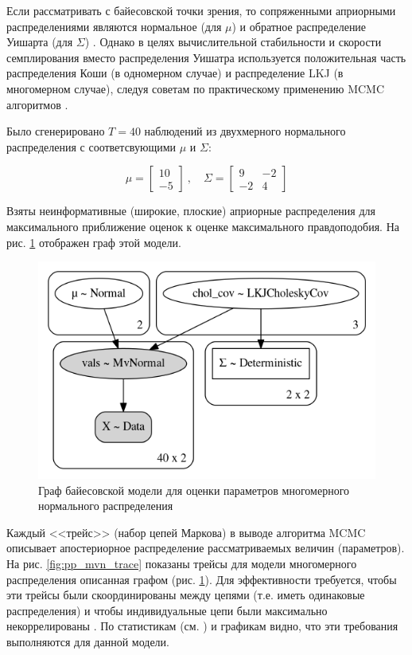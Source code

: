\documentclass[a4paper,14pt]{extreport}
\begin{document}
Если рассматривать с байесовской точки зрения, то сопряженными априорными распределениями являются нормальное (для $\mu$) и обратное распределение Уишарта (для $\Sigma$) \cite{stan_user_guide}. Однако в целях вычислительной стабильности и скорости семплирования вместо распределения Уишатра используется положительная часть распределения Коши (в одномерном случае) и распределение LKJ (в многомерном случае), следуя советам по практическому применению MCMC алгоритмов \cite{stan_user_guide}.

Было сгенерировано $T=40$ наблюдений из двухмерного нормального распределения с соответсвующими $\mu$ и $\Sigma$:

\begin{equation}
	\mu = 
	\begin{bmatrix}
		10 \\
		-5
	\end{bmatrix}
	\	, \quad
	\Sigma = 
	\begin{bmatrix} 
		9  & -2 \\
		-2 & 4 
	\end{bmatrix}
\end{equation}

Взяты неинформативные (широкие, плоские) априорные распределения для максимального приближение оценок к оценке максимального правдоподобия. На рис. \ref{fig:pp_mvn_graph} отображен граф этой модели.

\begin{figure}[H]
	\includegraphics[width=\linewidth]{img/gen/pp_mvn_graph.png}
	\caption{Граф байесовской модели для оценки параметров многомерного нормального распределения}
	\label{fig:pp_mvn_graph}
\end{figure}

Каждый <<трейс>> (набор цепей Маркова) в выводе алгоритма MCMC описывает апостериорное распределение рассматриваемых величин (параметров). На рис. \ref{fig:pp_mvn_trace} показаны трейсы для модели многомерного распределения описанная графом (рис. \ref{fig:pp_mvn_graph}). Для эффективности требуется, чтобы эти трейсы были скоординированы между цепями (т.е. иметь одинаковые распределения) и чтобы индивидуальные цепи были максимально некоррелированы \cite{stan_user_guide}. По статистикам (см. ) и графикам видно, что эти требования выполняются для данной модели.
\end{document}
